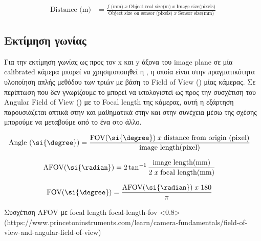 \begin{align}
	\textrm{Distance (m)} &= \frac{\textrm{$f$ (mm)}\; x\;\textrm{Object real size(m)}\; x\; \textrm{Image size(pixels)}}{\textrm{Object size on sensor (pixels)}\; x\; \textrm{Sensor size(mm)}} \label{eq:distance-from-object-pixels}
\end{align}


\subsection{Εκτίμηση γωνίας}
Για την εκτίμηση γωνίας ως προς τον x και y άξονα του image plane σε μία calibrated κάμερα μπορεί να χρησιμοποιηθεί η , η οποία είναι στην πραγματικότητα υλοποίηση απλής μεθόδου των τριών με βάση το Field of View () μίας κάμερας. Σε περίπτωση που δεν γνωρίζουμε το  μπορεί να υπολογιστεί ως προς την συσχέτιση του Angular Field of View () με το Focal length
της κάμερας, αυτή η εξάρτηση παρουσιάζεται οπτικά στην  και μαθηματικά στην  \cite{afov-focal-length-rela} και στην συνέχεια μέσω της σχέσης  μπορούμε να μεταβούμε από το ένα στο άλλο. 

\begin{align}
	\textrm{Angle (\si{\degree})} &= \frac{\textrm{FOV(\si{\degree})}\; x\;\textrm{distance from origin (pixel)}}{\textrm{image length(pixel)}} \label{eq:angle-from-object-center-pixels}
\end{align}

\begin{align}
	\textrm{AFOV(\si{\radian})} &= 2\tan^{-1}{\frac{\textrm{image length(mm)}}{2\; x\;\textrm{focal length(mm)}}} \label{eq:afov-focal-length}
\end{align}

\begin{align}
	\textrm{FOV(\si{\degree})} &= \frac{\textrm{AFOV(\si{\radian})}\; x\;\textrm{180}}{\pi} \label{eq:afov-to-fov}
\end{align}

{Συσχέτιση AFOV με focal length} %
{focal-length-fov} %
<0.8>
(https://www.princetoninstruments.com/learn/camera-fundamentals/field-of-view-and-angular-field-of-view)


